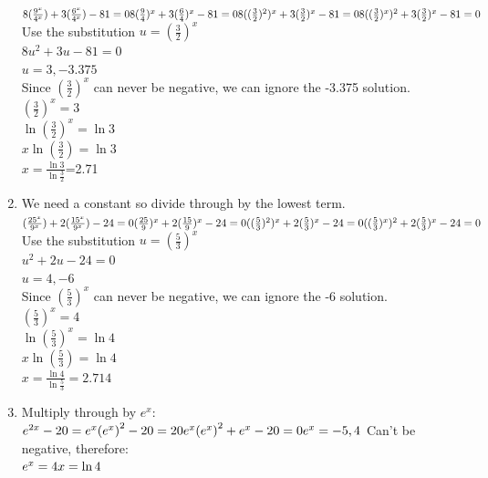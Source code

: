 \documentclass[../main.tex]{subfiles}
\begin{document}
\begin{spacing}{1.5}
\begin{enumerate}
    \(
    8(\frac{9^x}{4^x})+3(\frac{6^x}{4^x})-81=0\\
    8(\frac{9}{4})^x+3(\frac{6}{4})^x-81=0\\
    8((\frac{3}{2})^2)^x+3(\frac{3}{2})^x-81=0\\
    8((\frac{3}{2})^x)^2+3(\frac{3}{2})^x-81=0\\
    \)
    Use the substitution \(u=(\frac{3}{2})^x\)\\
    \(8u^2+3u-81=0\)\\
    \(u=3,-3.375\)\\
    Since \((\frac{3}{2})^x\) can never be negative, we can ignore the -3.375 solution.\\
    \((\frac{3}{2})^x=3\)\\
    \(\ln{(\frac{3}{2})^x}=\ln{3}\)\\
    \(x\ln{(\frac{3}{2})}=\ln{3}\)\\
    \(x=\frac{\ln{3}}{\ln{\frac{3}{2}}}\)=2.71
    \item 
    We need a constant so divide through by the lowest term.\\
    \(
    (\frac{25^x}{9^x})+2(\frac{15^x}{9^x})-24=0\\
    (\frac{25}{9})^x+2(\frac{15}{9})^x-24=0\\
    ((\frac{5}{3})^2)^x+2(\frac{5}{3})^x-24=0\\
    ((\frac{5}{3})^x)^2+2(\frac{5}{3})^x-24=0\\
    \)
    Use the substitution \(u=(\frac{5}{3})^x\)\\
    \(u^2+2u-24=0\)\\
    \(u=4,-6\)\\
    Since \((\frac{5}{3})^x\) can never be negative, we can ignore the -6 solution.\\
    \((\frac{5}{3})^x=4\)\\
    \(\ln{(\frac{5}{3})^x}=\ln{4}\)\\
    \(x\ln{(\frac{5}{3})}=\ln{4}\)\\
    \(x=\frac{\ln{4}}{\ln{\frac{5}{3}}}=2.714\)

    \item
    Multiply through by \(e^{x}\):\\
    \(
    e^{2x} - 20 = e^{x}\\
    {(e^{x})}^2 - 20 = 20e^{x}\\
    {(e^{x})}^2 + e^{x} - 20 = 0\\
    e^{x} = -5, 4\\\)
    Can't be negative, therefore:\\
    \(
    e^{x}=4\\
    x = \ln{4}
    \)


\end{enumerate}
\end{spacing}
\end{document}
